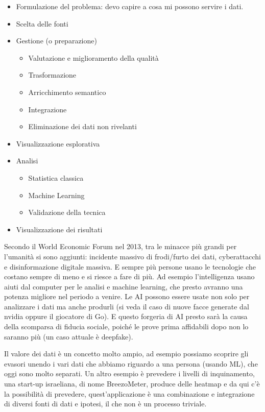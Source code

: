 \documentclass[]{article}
\begin{document}
\begin{itemize}
	\item
	Formulazione del problema: devo capire a cosa mi possono servire i
	dati.
	\item
	Scelta delle fonti
	\item
	Gestione (o preparazione)
	
	\begin{itemize}
		 
		\item
		Valutazione e miglioramento della qualità
		\item
		Trasformazione
		\item
		Arricchimento semantico
		\item
		Integrazione
		\item
		Eliminazione dei dati non rivelanti
	\end{itemize}
	\item
	Visualizzazione esplorativa
	\item
	Analisi
	
	\begin{itemize}
		 
		\item
		Statistica classica
		\item
		Machine Learning
		\item
		Validazione della tecnica
	\end{itemize}
	\item
	Visualizzazione dei risultati
\end{itemize}

Secondo il World Economic Forum nel 2013, tra le minacce più grandi per
l'umanità si sono aggiunti: incidente massivo di frodi/furto dei dati,
cyberattacchi e disinformazione digitale massiva. E sempre più persone
usano le tecnologie che costano sempre di meno e si riesce a fare di
più. Ad esempio l'intelligenza usano aiuti dal computer per le analisi e
machine learning, che presto avranno una potenza migliore nel periodo a
venire. Le AI possono essere usate non solo per analizzare i dati ma
anche produrli (si veda il caso di nuove facce generate dal nvidia
oppure il giocatore di Go). E questo forgeria di AI presto sarà la causa
della scomparsa di fiducia sociale, poiché le prove prima affidabili
dopo non lo saranno più (un caso attuale è deepfake).

Il valore dei dati è un concetto molto ampio, ad esempio possiamo
scoprire gli evasori unendo i vari dati che abbiamo riguardo a una
persona (usando ML), che oggi sono molto separati. Un altro esempio è
prevedere i livelli di inquinamento, una start-up israeliana, di nome
BreezoMeter, produce delle heatmap e da qui c'è la possibilità di
prevedere, quest'applicazione è una combinazione e integrazione di
diversi fonti di dati e ipotesi, il che non è un processo triviale.
\end{document}

